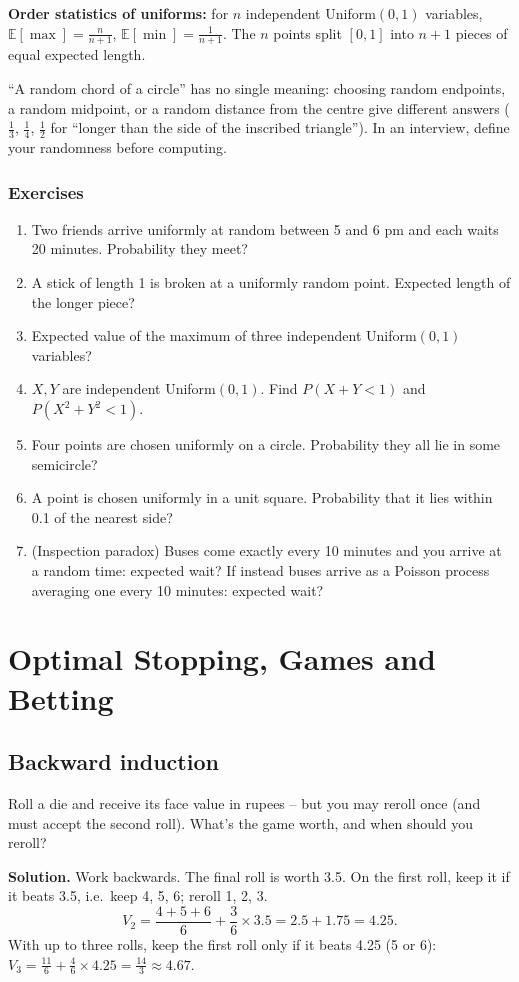 \documentclass[11pt,a4paper,openany]{report}
\newenvironment{exercises}{\subsection*{Exercises \thechapter}\begin{enumerate}[label=\textbf{\thechapter.\arabic*},leftmargin=3.2em]}{\end{enumerate}}
\newcommand{\E}{\mathbb{E}}
\begin{document}
\textbf{Order statistics of uniforms:} for $n$ independent Uniform$(0,1)$ variables, $\E[\max]=\frac n{n+1}$, $\E[\min]=\frac1{n+1}$. The $n$ points split $[0,1]$ into $n+1$ pieces of equal expected length.

\begin{trap}
``A random chord of a circle'' has no single meaning: choosing random endpoints, a random midpoint, or a random distance from the centre give different answers ($\frac13$, $\frac14$, $\frac12$ for ``longer than the side of the inscribed triangle''). In an interview, define your randomness before computing.
\end{trap}

\begin{exercises}
\item Two friends arrive uniformly at random between 5 and 6 pm and each waits 20 minutes. Probability they meet?
\item A stick of length 1 is broken at a uniformly random point. Expected length of the longer piece?
\item Expected value of the maximum of three independent Uniform$(0,1)$ variables?
\item $X,Y$ are independent Uniform$(0,1)$. Find $P(X+Y<1)$ and $P(X^2+Y^2<1)$.
\item Four points are chosen uniformly on a circle. Probability they all lie in some semicircle?
\item A point is chosen uniformly in a unit square. Probability that it lies within 0.1 of the nearest side?
\item (Inspection paradox) Buses come exactly every 10 minutes and you arrive at a random time: expected wait? If instead buses arrive as a Poisson process averaging one every 10 minutes: expected wait?
\end{exercises}

\chapter{Optimal Stopping, Games and Betting}\label{ch:stop}

\section{Backward induction}
\begin{example}
Roll a die and receive its face value in rupees -- but you may reroll once (and must accept the second roll). What's the game worth, and when should you reroll?

\textbf{Solution.} Work backwards. The final roll is worth 3.5. On the first roll, keep it if it beats 3.5, i.e.\ keep 4, 5, 6; reroll 1, 2, 3.
\[V_2=\frac{4+5+6}6+\frac36\times3.5=2.5+1.75=\mathbf{4.25}.\]
With up to three rolls, keep the first roll only if it beats 4.25 (5 or 6): $V_3=\frac{11}6+\frac46\times4.25=\frac{14}3\approx4.67$.
\end{example}
\end{document}
